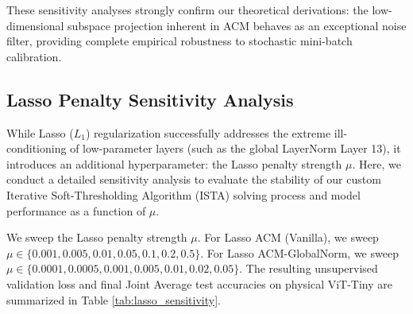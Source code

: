 These sensitivity analyses strongly confirm our theoretical derivations: the low-dimensional subspace projection inherent in ACM behaves as an exceptional noise filter, providing complete empirical robustness to stochastic mini-batch calibration.

\subsection{Lasso Penalty Sensitivity Analysis}
While Lasso ($L_1$) regularization successfully addresses the extreme ill-conditioning of low-parameter layers (such as the global LayerNorm Layer 13), it introduces an additional hyperparameter: the Lasso penalty strength $\mu$. Here, we conduct a detailed sensitivity analysis to evaluate the stability of our custom Iterative Soft-Thresholding Algorithm (ISTA) solving process and model performance as a function of $\mu$.

We sweep the Lasso penalty strength $\mu$. For Lasso ACM (Vanilla), we sweep $\mu \in \{0.001, 0.005, 0.01, 0.05, 0.1, 0.2, 0.5\}$. For Lasso ACM-GlobalNorm, we sweep $\mu \in \{0.0001, 0.0005, 0.001, 0.005, 0.01, 0.02, 0.05\}$. The resulting unsupervised validation loss and final Joint Average test accuracies on physical ViT-Tiny are summarized in Table \ref{tab:lasso_sensitivity}.

